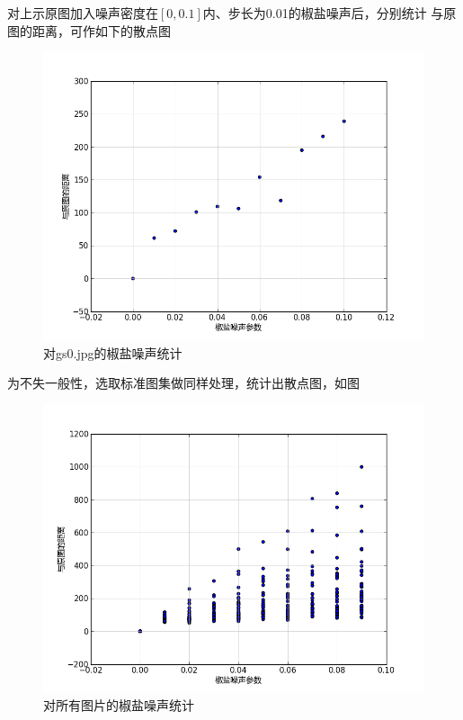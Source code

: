 对上示原图加入噪声密度在$[0, 0.1]$内、步长为0.01的椒盐噪声后，分别统计
与原图的距离，可作如下的散点图
\begin{figure}[H]
  \centering
  \includegraphics[keepaspectratio=true,
  scale=0.6]{images/speckle_gs0.png}
  \caption{对gs0.jpg的椒盐噪声统计}
  \label{fig:speckle-gs0-scatter-plot}
\end{figure}

为不失一般性，选取标准图集做同样处理，统计出散点图，如图
\begin{figure}[H]
  \centering
  \includegraphics[keepaspectratio=true,
  scale=0.6]{images/speckle_all.png}
  \caption{对所有图片的椒盐噪声统计}
  \label{fig:speckle-all-scatter-plot}
\end{figure}

